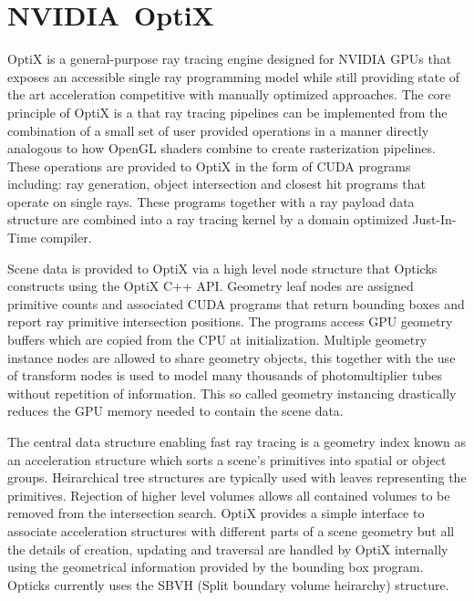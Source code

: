 \documentclass[a4paper]{jpconf}
\begin{document}
\section{NVIDIA\textregistered\ OptiX\texttrademark}

OptiX\cite{optixPaper} \cite{optixSite} is a general-purpose ray tracing engine 
designed for NVIDIA GPUs that exposes an accessible single ray programming model 
while still providing state of the art acceleration competitive with 
manually optimized approaches\cite{understanding}\cite{understandingAddendum}.  
%
The core principle of OptiX is a that ray tracing pipelines can be implemented 
from the combination of a small set of user provided operations
in a manner directly analogous to how OpenGL shaders combine to create rasterization pipelines.
These operations are provided to OptiX in the form of CUDA programs \cite{cudaPaper} \cite{cudaURL} 
including: ray generation, object intersection and closest hit programs that operate on 
single rays. These programs together with a ray payload data structure are combined 
into a ray tracing kernel by a domain optimized Just-In-Time compiler.

Scene data is provided to OptiX via a high level node structure that 
Opticks constructs using the OptiX C++ API. 
Geometry leaf nodes are assigned primitive counts 
and associated CUDA programs that return bounding boxes and 
report ray primitive intersection positions. 
The programs access GPU geometry buffers which are copied from the CPU at initialization.
Multiple geometry instance nodes are allowed to share geometry objects, this 
together with the use of transform nodes is used to model many thousands of  
photomultiplier tubes without repetition of information. This so called geometry 
instancing drastically reduces the GPU memory needed to contain the scene data.

The central data structure enabling fast ray tracing is a geometry index
known as an acceleration structure which sorts a scene’s primitives 
into spatial or object groups. 
Heirarchical tree structures are typically used
with leaves representing the primitives.  Rejection of higher level
volumes allows all contained volumes to be removed from the intersection
search. OptiX provides a simple interface to associate acceleration structures 
with different parts of a scene geometry but all the details of creation, updating 
and traversal are handled by OptiX internally using the geometrical information provided by the 
bounding box program. Opticks currently uses the SBVH (Split boundary volume heirarchy) structure\cite{sbvh}.
\end{document}
